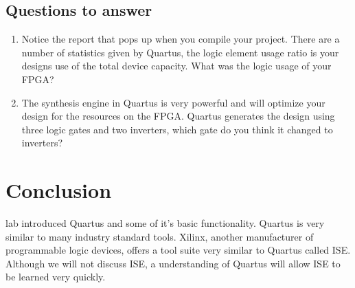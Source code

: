 \documentclass[12pt,journal]{IEEEtran}
\begin{document}
    \subsection{Questions to answer}
    \begin{enumerate}
      \item Notice the report that pops up when you compile your project. There are a number of statistics given by Quartus, the logic element usage ratio is your designs use of the total device capacity. What was the logic usage of your FPGA?
      \item The synthesis engine in Quartus is very powerful and will optimize your design for the resources on the   FPGA. Quartus generates the design using three logic gates and two inverters, which gate do you think it changed to inverters?
    \end{enumerate}

  \section{Conclusion}
     lab introduced Quartus and some of it's basic functionality. Quartus is very similar to many industry standard tools. Xilinx, another manufacturer of programmable logic devices, offers a tool suite very similar to Quartus called ISE. Although we will not discuss ISE, a understanding of Quartus will allow ISE to be learned very quickly.

    
\end{document}
